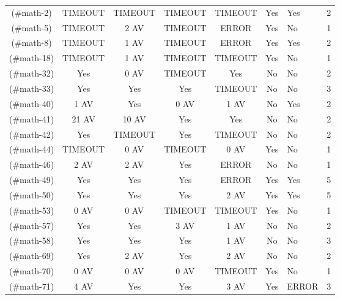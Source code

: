 \begin{table}[!t]
{\begin{tabular}{|c|c|c|c|c|c|}
\hline
[M2](#math-2)     & TIMEOUT   & TIMEOUT   & TIMEOUT   & TIMEOUT   & Yes       & Yes       &      2 \\
[M5](#math-5)     & TIMEOUT   & 2 AV      & TIMEOUT   & ERROR     & Yes       & No        &      1 \\
[M8](#math-8)     & TIMEOUT   & 1 AV      & TIMEOUT   & ERROR     & Yes       & Yes       &      2 \\
[M18](#math-18)   & TIMEOUT   & 1 AV      & TIMEOUT   & TIMEOUT   & Yes       & No        &      1 \\
[M32](#math-32)   & Yes       & 0 AV      & TIMEOUT   & Yes       & No        & No        &      2 \\
[M33](#math-33)   & Yes       & Yes       & Yes       & TIMEOUT   & No        & No        &      3 \\
[M40](#math-40)   & 1 AV      & Yes       & 0 AV      & 1 AV      & No        & Yes       &      2 \\
[M41](#math-41)   & 21 AV     & 10 AV     & Yes       & Yes       & No        & No        &      2 \\
[M42](#math-42)   & Yes       & TIMEOUT   & Yes       & TIMEOUT   & No        & No        &      2 \\
[M44](#math-44)   & TIMEOUT   & 0 AV      & TIMEOUT   & 0 AV      & Yes       & No        &      1 \\
[M46](#math-46)   & 2 AV      & 2 AV      & Yes       & ERROR     & No        & No        &      1 \\
[M49](#math-49)   & Yes       & Yes       & Yes       & ERROR     & Yes       & Yes       &      5 \\
[M50](#math-50)   & Yes       & Yes       & Yes       & 2 AV      & Yes       & Yes       &      5 \\
[M53](#math-53)   & 0 AV      & 0 AV      & TIMEOUT   & TIMEOUT   & Yes       & No        &      1 \\
[M57](#math-57)   & Yes       & Yes       & 3 AV      & 1 AV      & No        & No        &      2 \\
[M58](#math-58)   & Yes       & Yes       & Yes       & 1 AV      & No        & No        &      3 \\
[M69](#math-69)   & Yes       & 2 AV      & Yes       & 2 AV      & No        & No        &      2 \\
[M70](#math-70)   & 0 AV      & 0 AV      & 0 AV      & TIMEOUT   & Yes       & No        &      1 \\
[M71](#math-71)   & 4 AV      & Yes       & Yes       & 3 AV      & Yes       & ERROR     &      3 \\

\end{tabular}}
\end{table}
